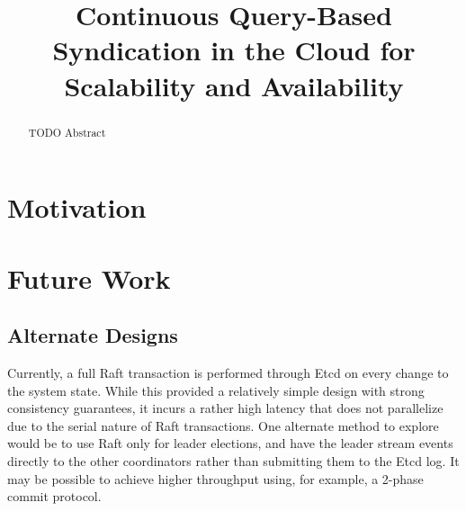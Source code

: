 \documentclass[conference]{IEEEtran}
\begin{document}
\title{Continuous Query-Based Syndication in the Cloud for Scalability and Availability}

\author{
\and
{}
}

\maketitle

\begin{abstract}
TODO Abstract
\end{abstract}



\section{Motivation} 








\section{Future Work}

\subsection{Alternate Designs}
\label{subsec:alternate_designs}


Currently, a full Raft transaction is performed through Etcd on every change to the system state.
While this provided a relatively simple design with strong consistency guarantees, it incurs a rather high latency that does not parallelize due to the serial nature of Raft transactions.
One alternate method to explore would be to use Raft only for leader elections, and have the leader stream events directly to the other coordinators rather than submitting them to the Etcd log.
It may be possible to achieve higher throughput using, for example, a 2-phase commit protocol. 
\end{document}
